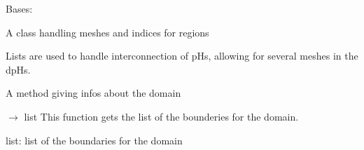 \documentclass[letterpaper,10pt,english]{sphinxmanual}
\begin{document}
\begin{fulllineitems}
\label{\detokenize{scrimp:scrimp.domain.Domain}}
\pysigstartsignatures
\pysiglinewithargsret
{}
{\sphinxparamcomma {}\sphinxparamcomma {}\sphinxparamcomma {}\sphinxparamcomma {}\sphinxparamcomma {}}
{}
\pysigstopsignatures
\sphinxAtStartPar
Bases: 

\sphinxAtStartPar
A class handling meshes and indices for regions

\sphinxAtStartPar
Lists are used to handle interconnection of pHs, allowing for several meshes in the dpHs.

\begin{fulllineitems}
\label{\detokenize{scrimp:scrimp.domain.Domain.display}}
\pysigstartsignatures
\pysiglinewithargsret
{}
{}
{}
\pysigstopsignatures
\sphinxAtStartPar
A method giving infos about the domain

\end{fulllineitems}


\begin{fulllineitems}
\label{\detokenize{scrimp:scrimp.domain.Domain.get_boundaries}}
\pysigstartsignatures
\pysiglinewithargsret
{}
{}
{{ $\rightarrow$ list}}
\pysigstopsignatures
\sphinxAtStartPar
This function gets the list of the bounderies for the domain.
\begin{description}
\sphinxAtStartPar
list: list of the boundaries for the domain

\end{description}


\end{fulllineitems}
\end{fulllineitems}
\end{document}
